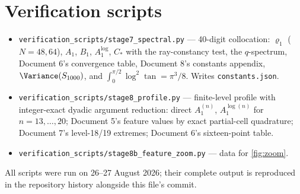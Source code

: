 \documentclass[11pt,oneside]{article}
\theoremstyle{definition}
\theoremstyle{remark}
\begin{document}
\section{Verification scripts}
\label{app:scripts}

\begin{itemize}
\item \nolinkurl{verification_scripts/stage7_spectral.py} ---
40-digit collocation: $\varrho_1$ ($N=48,64$), $A_1$, $B_1$,
$A_1^{\log}$, $C_*$ with the ray-constancy test, the $q$-spectrum,
Document 6's convergence table, Document 8's constants appendix,
$\Variance(S_{1000})$, and $\int_0^{\pi/2}\log^2\tan=\pi^3/8$.  Writes
\nolinkurl{constants.json}.
\item \nolinkurl{verification_scripts/stage8_profile.py} ---
finite-level profile with integer-exact dyadic argument reduction:
direct $A_1^{(n)}$, $A_1^{\log(n)}$ for $n=13,\dots,20$; Document 5's
feature values by exact partial-cell quadrature; Document 7's
level-18/19 extremes; Document 6's sixteen-point table.
\item \nolinkurl{verification_scripts/stage8b_feature_zoom.py} ---
data for \cref{fig:zoom}.
\end{itemize}
All scripts were run on 26--27 August 2026; their complete output is
reproduced in the repository history alongside this file's commit.
\end{document}
